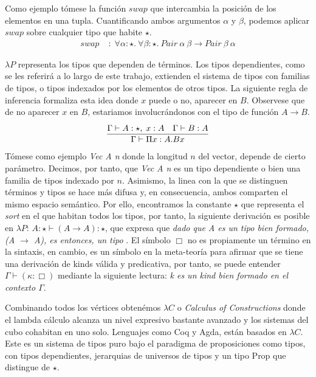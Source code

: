 \begin{example}
  Como ejemplo tómese la función $swap$ que intercambia la posición de los elementos en una tupla. Cuantificando ambos argumentos $\alpha$ y $\beta$, podemos aplicar $swap$ sobre cualquier tipo que habite $\star$.
  \begin{align*}
    \mathit{swap} &\;:\; \forall \alpha : \star.\ \forall \beta : \star.\
    \mathit{Pair}\ \alpha\ \beta \to \mathit{Pair}\ \beta\ \alpha
  \end{align*}
\end{example}

$\lambda P$ representa los tipos que dependen de términos. Los tipos dependientes, como se les referirá a lo largo de este trabajo, extienden el sistema de tipos con familias de tipos, o tipos indexados por los elementos de otros tipos. La siguiente regla de inferencia formaliza esta idea donde $x$ puede o no, aparecer en $B$. Observese que de no aparecer $x$ en $B$, estariamos involucrándonos con el tipo de función $A \to B$.
\begin{align}
\infer{\Gamma \vdash \Pi x : A . B x }{%
    \Gamma \vdash A : \star,\; x : A
    & \deduce{\Gamma \vdash B : A}{}
  }
\end{align}
\newline
\newline
\indent Tómese como ejemplo \textit{Vec A n} donde la longitud $n$ del vector, depende de cierto parámetro. Decimos, por tanto, que \textit{Vec A n} es un tipo dependiente o bien una familia de tipos indexado por $n$. Asimismo, la linea con la que se distinguen términos y tipos se hace más difusa y, en consecuencia, ambos comparten el mismo espacio semántico. Por ello, encontramos la constante $\star$ que representa el \textit{sort} en el que habitan todos los tipos, por tanto, la siguiente derivación es posible en $\lambda P$: $A : \star \vdash (A \to A) : \star$, que expresa que \textit{dado que A es un tipo bien formado, (A $\to$ A), es entonces, un tipo} \citep{cube1991}. El símbolo $\Box$ no es propiamente un término en la sintaxis, en cambio, es un símbolo en la meta-teoría para afirmar que se tiene una derivación de kinds válida y predicativa, por tanto, se puede entender $\Gamma \vdash (\kappa : \Box)$ mediante la siguiente lectura: \textit{k es un kind bien formado en el contexto $\Gamma$}.

Combinando todos los vértices obtenémos $\lambda C$ o \textit{Calculus of Constructions} donde el lambda cálculo alcanza un nivel expresivo bastante avanzado y los sistemas del cubo cohabitan en uno solo. Lenguajes como Coq y Agda, están basados en $\lambda C$. Este es un sistema de tipos puro bajo el paradigma de proposiciones como tipos, con tipos dependientes, jerarquias de universos de tipos y un tipo Prop que distingue de $\star$.

